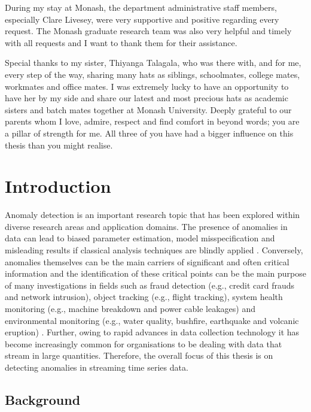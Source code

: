 \documentclass{monashthesis}
\theoremstyle{definition}
\theoremstyle{definition}
\theoremstyle{definition}
\theoremstyle{remark}
\begin{document}
During my stay at Monash, the department administrative staff members, especially Clare Livesey, were very supportive and positive regarding every request. The Monash graduate research team was also very helpful and timely with all requests and I want to thank them for their assistance.

Special thanks to my sister, Thiyanga Talagala, who was there with, and for me, every step of the way, sharing many hats as siblings, schoolmates, college mates, workmates and office mates. I was extremely lucky to have an opportunity to have her by my side and share our latest and most precious hats as academic sisters and batch mates together at Monash University.
Deeply grateful to our parents whom I love, admire, respect and find comfort in beyond words; you are a pillar of strength for me. All three of you have had a bigger influence on this thesis than you might realise.

\clearpage{}\setcounter{page}{0}

\hypertarget{ch:intro}{%
\chapter{Introduction}\label{ch:intro}}

Anomaly detection is an important research topic that has been explored within diverse research areas and application domains. The presence of anomalies in data can lead to biased parameter estimation, model misspecification and misleading results if classical analysis techniques are blindly applied \autocite{abuzaid2013detection,ben2005outlier}. Conversely, anomalies themselves can be the main carriers of significant and often critical information and the identification of these critical points can be the main purpose of many investigations in fields such as fraud detection (e.g., credit card frauds and network intrusion), object tracking (e.g., flight tracking), system health monitoring (e.g., machine breakdown and power cable leakages) and environmental monitoring (e.g., water quality, bushfire, earthquake and volcanic eruption) \autocite{gupta2014outliersurvey}. Further, owing to rapid advances in data collection technology it has become increasingly common for organisations to be dealing with data that stream in large quantities. Therefore, the overall focus of this thesis is on detecting anomalies in streaming time series data.

\hypertarget{background}{%
\section{Background}\label{background}}
\end{document}
